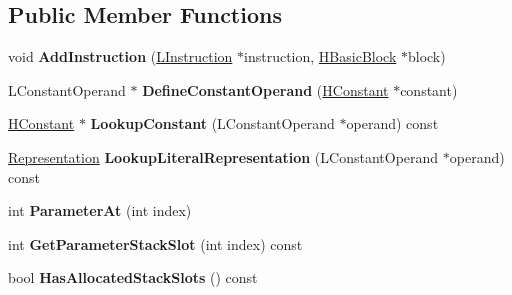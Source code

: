 \subsection*{Public Member Functions}
\begin{DoxyCompactItemize}
\item 
void {\bfseries Add\+Instruction} (\hyperlink{classv8_1_1internal_1_1_l_instruction}{L\+Instruction} $\ast$instruction, \hyperlink{classv8_1_1internal_1_1_h_basic_block}{H\+Basic\+Block} $\ast$block)\hypertarget{classv8_1_1internal_1_1_l_chunk_ad61fb173e7a2305e812dfde6c6fad28f}{}\label{classv8_1_1internal_1_1_l_chunk_ad61fb173e7a2305e812dfde6c6fad28f}

\item 
L\+Constant\+Operand $\ast$ {\bfseries Define\+Constant\+Operand} (\hyperlink{classv8_1_1internal_1_1_h_constant}{H\+Constant} $\ast$constant)\hypertarget{classv8_1_1internal_1_1_l_chunk_a17296845892624f9c6862be505f621bc}{}\label{classv8_1_1internal_1_1_l_chunk_a17296845892624f9c6862be505f621bc}

\item 
\hyperlink{classv8_1_1internal_1_1_h_constant}{H\+Constant} $\ast$ {\bfseries Lookup\+Constant} (L\+Constant\+Operand $\ast$operand) const \hypertarget{classv8_1_1internal_1_1_l_chunk_aca6d850d204e58b41bb561995e15b58f}{}\label{classv8_1_1internal_1_1_l_chunk_aca6d850d204e58b41bb561995e15b58f}

\item 
\hyperlink{classv8_1_1internal_1_1_representation}{Representation} {\bfseries Lookup\+Literal\+Representation} (L\+Constant\+Operand $\ast$operand) const \hypertarget{classv8_1_1internal_1_1_l_chunk_a9fae3d4fe86ca091e3ae086827dee4ed}{}\label{classv8_1_1internal_1_1_l_chunk_a9fae3d4fe86ca091e3ae086827dee4ed}

\item 
int {\bfseries Parameter\+At} (int index)\hypertarget{classv8_1_1internal_1_1_l_chunk_a8086a0448009f33580ff1038d86eeb38}{}\label{classv8_1_1internal_1_1_l_chunk_a8086a0448009f33580ff1038d86eeb38}

\item 
int {\bfseries Get\+Parameter\+Stack\+Slot} (int index) const \hypertarget{classv8_1_1internal_1_1_l_chunk_a162cec8165c964ff82c6b107cb898a1c}{}\label{classv8_1_1internal_1_1_l_chunk_a162cec8165c964ff82c6b107cb898a1c}

\item 
bool {\bfseries Has\+Allocated\+Stack\+Slots} () const \hypertarget{classv8_1_1internal_1_1_l_chunk_ab5ab51887ef0a4d939993cfa1bdf4af9}{}\label{classv8_1_1internal_1_1_l_chunk_ab5ab51887ef0a4d939993cfa1bdf4af9}


\end{DoxyCompactItemize}
